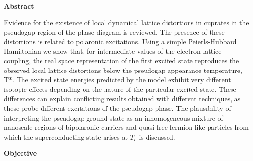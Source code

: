 
\cleardoublepage
{}
{}
\begin{center}
\textbf{\large Abstract}
\end{center}
Evidence for the existence of local dynamical lattice distortions in cuprates in the pseudogap region of the phase diagram is reviewed. The presence of these distortions is related to polaronic excitations. Using a simple Peierls-Hubbard Hamiltonian we show that, for intermediate values of the electron-lattice coupling, the real space representation of the first excited state reproduces the observed local lattice distortions below the pseudogap appearance temperature, T*. The excited state energies predicted by the model exhibit very different isotopic effects depending on the nature of the particular excited state. These differences can explain conflicting results obtained with different techniques, as these probe different excitations of the pseudogap phase. The plausibility of interpreting the pseudogap ground state as an inhomogeneous mixture of nanoscale regions of bipolaronic carriers and quasi-free fermion like particles from which the superconducting state arises at $T_c$ is discussed.


\cleardoublepage
{}
{}
\begin{center}
\textbf{\large Objective}
\end{center}
